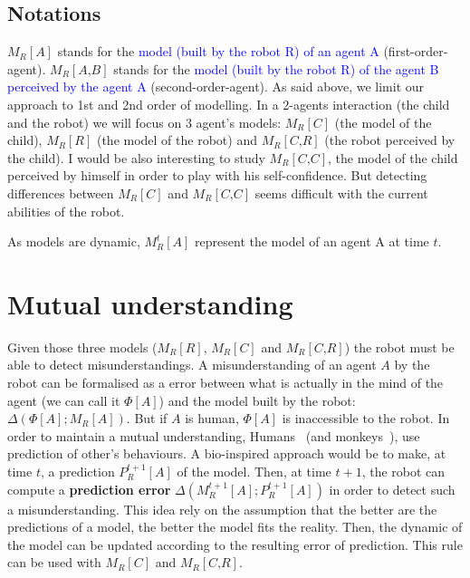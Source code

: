 \documentclass[conference]{IEEEtran}
\begin{document}
\subsection{Notations}
$M_R\left[\textit{A}\right]$ stands for the \textcolor{blue}{model (built by the robot R) of an agent A} (first-order-agent). $M_R\left[\textit{A,B}\right]$ stands for the \textcolor{blue}{model (built by the robot R) of the agent B perceived by the agent A} (second-order-agent). As said above, we limit our approach to 1st and 2nd order of modelling. In a 2-agents interaction (the child and the robot) we will focus on 3 agent's models: $ M_R\left[\textit{C}\right]$ (the model of the child), $ M_R\left[\textit{R}\right]$ (the model of the robot) and $ M_R\left[\textit{C,R}\right]$ (the robot perceived by the child). I would be also interesting to study $ M_R\left[\textit{C,C}\right]$, the model of the child perceived by himself in order to play with his self-confidence. But detecting differences between $ M_R\left[\textit{C}\right]$ and $ M_R\left[\textit{C,C}\right]$ seems difficult with the current abilities of the robot. 

As models are dynamic, $ M^t_R\left[\textit{A}\right]$ represent the model of an agent A at time $t$.

\section{Mutual understanding}
Given those three models ($ M_R\left[\textit{R}\right]$, $ M_R\left[\textit{C}\right]$ and $ M_R\left[\textit{C,R}\right]$) the robot must be able to detect misunderstandings. A misunderstanding of an agent $A$ by the robot can be formalised as a error between what is actually in the mind of the agent (we can call it $\Phi[A]$) and the model built by the robot: $\Delta \left(\Phi[A] ; M_R\left[\textit{A}\right]\right)$. But if $A$ is human, $\Phi[A]$ is inaccessible to the robot. In order to maintain a mutual understanding, Humans~\cite{suzuki2015neural} (and monkeys~\cite{haroush2015neuronal}), use prediction of other's behaviours. A bio-inspired approach would be to make, at time $t$, a prediction $P^{t+1}_R\left[\textit{A}\right]$ of the model. Then, at time $t+1$, the robot can compute a \textbf{prediction error} $\Delta \left( M^{t+1}_R\left[\textit{A}\right]; P^{t+1}_R\left[\textit{A}\right]\right)$ in order to detect such a misunderstanding. This idea rely on the assumption that the better are the predictions of a model, the better the model fits the reality. Then, the dynamic of the model can be updated according to the resulting error of prediction. This rule can be used with $ M_R\left[\textit{C}\right]$ and $ M_R\left[\textit{C,R}\right]$. 
\end{document}
